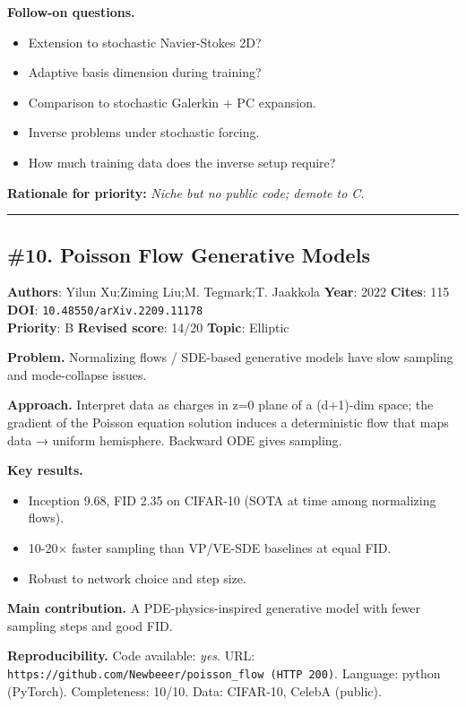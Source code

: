 \documentclass[10pt,letterpaper]{article}
\begin{document}
\textbf{Follow-on questions.}
\begin{itemize}
\item Extension to stochastic Navier-Stokes 2D?
\item Adaptive basis dimension during training?
\item Comparison to stochastic Galerkin + PC expansion.
\item Inverse problems under stochastic forcing.
\item How much training data does the inverse setup require?
\end{itemize}

\textbf{Rationale for priority:} \emph{Niche but no public code; demote to C.}

\medskip\hrule\medskip

\subsection*{\#10. Poisson Flow Generative Models}
\textbf{Authors}: Yilun Xu;Ziming Liu;M. Tegmark;T. Jaakkola \textbullet{} \textbf{Year}: 2022 \textbullet{} \textbf{Cites}: 115 \textbullet{} \textbf{DOI}: \texttt{10.48550/arXiv.2209.11178} \\
\textbf{Priority}: B \textbullet{} \textbf{Revised score}: 14/20 \textbullet{} \textbf{Topic}: Elliptic

\textbf{Problem.} Normalizing flows / SDE-based generative models have slow sampling and mode-collapse issues.

\textbf{Approach.} Interpret data as charges in z=0 plane of a (d+1)-dim space; the gradient of the Poisson equation solution induces a deterministic flow that maps data → uniform hemisphere. Backward ODE gives sampling.

\textbf{Key results.}
\begin{itemize}
\item Inception 9.68, FID 2.35 on CIFAR-10 (SOTA at time among normalizing flows).
\item 10-20× faster sampling than VP/VE-SDE baselines at equal FID.
\item Robust to network choice and step size.
\end{itemize}

\textbf{Main contribution.} A PDE-physics-inspired generative model with fewer sampling steps and good FID.

\textbf{Reproducibility.} Code available: \emph{yes}. URL: \texttt{https://github.com/Newbeeer/poisson\_flow (HTTP 200)}. Language: python (PyTorch). Completeness: 10/10. Data: CIFAR-10, CelebA (public).
\end{document}
